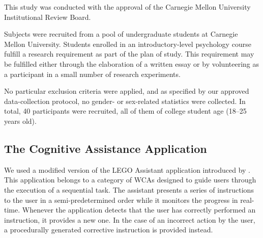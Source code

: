 \documentclass[10pt,letterpaper]{article}
\providecommand{\DIFaddtex}[1]{#1} %
\providecommand{\DIFdeltex}[1]{} %
\providecommand{\DIFaddbegin}{\protect\color{blue}} %
\providecommand{\DIFaddend}{\protect\color{black}} %
\providecommand{\DIFdelbegin}{\protect\color{red}} %
\providecommand{\DIFdelend}{\protect\color{black}} %
\providecommand{\DIFadd}[1]{\texorpdfstring{\DIFaddtex{#1}}{#1}} %
\providecommand{\DIFdel}[1]{\texorpdfstring{\DIFdeltex{#1}}{}} %
\newcommand{\DIFscaledelfig}{0.5}
\newlength{\DIFdelgraphicswidth} %
\newlength{\DIFdelgraphicsheight} %
\newcommand{\DIFaddincludegraphics}[2][]{{\color{blue}\fbox{\DIFOincludegraphics[#1]{#2}}}} %
\newcommand{\DIFdelincludegraphics}[2][]{%
\sbox{\DIFdelgraphicsbox}{\DIFOincludegraphics[#1]{#2}}%
\settoboxwidth{\DIFdelgraphicswidth}{\DIFdelgraphicsbox} %
\settoboxtotalheight{\DIFdelgraphicsheight}{\DIFdelgraphicsbox} %
\scalebox{\DIFscaledelfig}{%
\parbox[b]{\DIFdelgraphicswidth}{\usebox{\DIFdelgraphicsbox}\\[-\baselineskip] \rule{\DIFdelgraphicswidth}{0em}}\llap{\resizebox{\DIFdelgraphicswidth}{\DIFdelgraphicsheight}{%
\setlength{\unitlength}{\DIFdelgraphicswidth}%
\begin{picture}(1,1)%
\thicklines\linethickness{2pt} %
{\color[rgb]{1,0,0}\put(0,0){\framebox(1,1){}}}%
{\color[rgb]{1,0,0}\put(0,0){\line( 1,1){1}}}%
{\color[rgb]{1,0,0}\put(0,1){\line(1,-1){1}}}%
\end{picture}%
}\hspace*{3pt}}} %
} %
\DeclareRobustCommand{\DIFaddbegin}{\DIFOaddbegin \let\includegraphics\DIFaddincludegraphics} %
\DeclareRobustCommand{\DIFaddend}{\DIFOaddend \let\includegraphics\DIFOincludegraphics} %
\DeclareRobustCommand{\DIFdelbegin}{\DIFOdelbegin \let\includegraphics\DIFdelincludegraphics} %
\DeclareRobustCommand{\DIFdelend}{\DIFOaddend \let\includegraphics\DIFOincludegraphics} %
\begin{document}
This study was conducted with the approval of the Carnegie Mellon University Institutional Review Board.
\DIFaddbegin 

\DIFaddend Subjects were recruited from a pool of undergraduate students \DIFdelbegin \DIFdel{fulfilling a course requirement }\DIFdelend at Carnegie Mellon University.
\DIFaddbegin \DIFadd{Students enrolled in an introductory-level psychology course fulfill a research requirement as part of the plan of study.
This requirement may be fulfilled either through the elaboration of a written essay or by volunteering as a participant in a small number of research experiments.
}

\DIFaddend No particular exclusion criteria were applied\DIFaddbegin \DIFadd{, and as specified by our approved data-collection protocol, no gender- or sex-related statistics were collected}\DIFaddend .
In total, 40 participants were recruited, all of them of college student age (\numrange{18}{25} years old).

\subsection{The Cognitive Assistance Application}

We used a modified version of the LEGO Assistant application introduced by \textcite{Chen:EarlyImplementation}.
This application belongs to a category of \DIFdelbegin \DIFdel{\emph{WCA}s that are }\DIFdelend \DIFaddbegin \DIFadd{WCAs }\DIFaddend designed to guide users through the execution of a sequential task.
\DIFdelbegin \DIFdel{Such applications constitute ``\emph{conversational computing tasks}'' in the taxonomy proposed by \textcite{dabrowsky:2011:40years}.
A set of instructions are to be performed by }\DIFdelend %
\DIFaddbegin \DIFadd{The assistant presents a series of instructions to }\DIFaddend the user in a semi-predetermined order \DIFdelbegin \DIFdel{.
The results of the user performing these instructions are provided as inputs to the system.
These inputs may either be correct, in which case the system proceeds to output the next instruction, or incorrect , in which case }\DIFdelend \DIFaddbegin \DIFadd{while it monitors the progress in real-time.
Whenever the application detects that the user has correctly performed an instruction, it provides a new one.
In the case of an incorrect action by the user, }\DIFaddend a procedurally generated corrective \DIFdelbegin \DIFdel{step that fixes the mistake is provided to the user.
}\DIFdelend \DIFaddbegin \DIFadd{instruction is provided instead.
}\DIFaddend 
\end{document}
